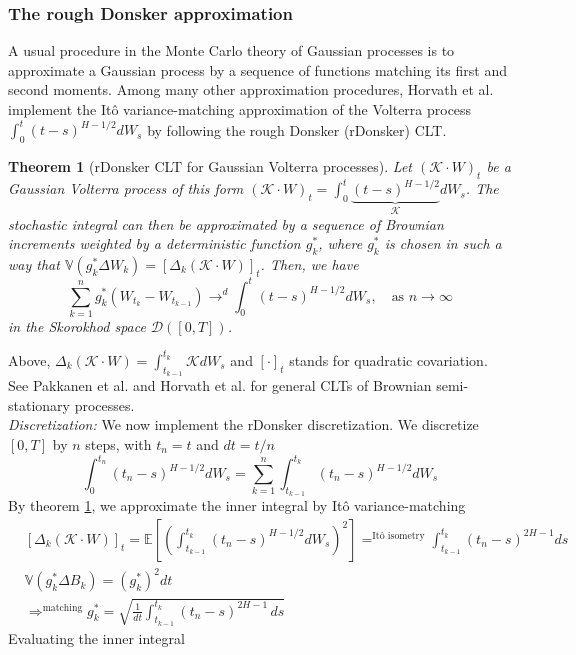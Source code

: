 \documentclass[12pt,a4paper]{article}
\newtheorem{theorem}{Theorem}[section] \newtheorem{proposition}[theorem]{Proposition} \newtheorem{lemma}[theorem]{Lemma} \newtheorem{corollary}[theorem]{Corollary} \theoremstyle{definition} \newtheorem{definition}[theorem]{Definition}
\theoremstyle{remark} \newtheorem{remark}[theorem]{Remark}
\begin{document}
\subsubsection{The rough Donsker approximation}
A usual procedure in the Monte Carlo theory of Gaussian processes is to approximate a Gaussian process by a sequence of functions matching its first and second moments. Among many other approximation procedures, Horvath et al. \cite{2} implement the Itô variance-matching approximation of the Volterra process $\displaystyle 
\int_0^t (t-s)^{H-1/2}dW_s$
by following the rough Donsker (rDonsker) CLT. 
\begin{theorem}[rDonsker CLT for Gaussian Volterra processes]\label{rDonsker thm}
    Let  $(\mathcal K\cdot W)_t$ be a Gaussian Volterra process of this form $(\mathcal K\cdot W)_t=\displaystyle \int _0^t\underbrace{(t-s)^{H-1/2}}_{\mathcal K}dW_s$. The stochastic integral can then be approximated by a sequence of Brownian increments weighted by a deterministic function $g_k^*$, where $g_k^*$ is chosen in such a way that $\displaystyle \mathbb V(g_k^*\Delta W_k)=[\Delta _k(\mathcal K\cdot W)]_t$. Then, we have 
    \[
    \sum _{k=1}^{n}g_k^*\left(W_{t_k}-W_{t_{k-1}}\right)\to^{d} \int _0^t(t-s)^{H-1/2}dW_s, \quad \text{as }n\to \infty 
    \]
    in the Skorokhod space $\mathcal D([0,T])$.
\end{theorem}
Above, $\displaystyle \Delta _k(\mathcal K\cdot W)=\int_{t_{k-1}}^{t_k}\mathcal KdW_s$ and $[\cdot ]_t$ stands for quadratic covariation. See Pakkanen et al. \cite{Pakkanen} and Horvath et al. \cite{2} for general CLTs of Brownian semi-stationary processes.\vspace{1em}\\
\textit{Discretization:} We now implement the rDonsker discretization. We discretize $[0,T]$ by $n$ steps, with $t_n=t$ and $dt=t/n$
\[
\int_{0}^{t_n}(t_n-s)^{H-1/2}dW_s=\sum _{k=1}^n\int_{t_{k-1}}^{t_k}(t_n-s)^{H-1/2}dW_s
\]
By theorem \ref{rDonsker thm}, we approximate the inner integral by Itô variance-matching
\begin{align*}
    &\left[\Delta _k(\mathcal K\cdot W)\right]_t=\mathbb E\left[\left(\int_{t_{k-1}}^{t_k}(t_n-s)^{H-1/2}dW_s\right)^2\right]=^{\text{Itô isometry}}\int_{t_{k-1}}^{t_k}(t_n-s)^{2H-1}ds\\
    & \mathbb V(g_k^* \Delta B_k)=(g_k^*)^2dt\\
    &\Rightarrow^{\text{matching}} g_k^*=\sqrt{\frac{1}{dt}\int_{t_{k-1}}^{t_k}(t_n-s)^{2H-1}\,ds}
\end{align*}
Evaluating the inner integral
\end{document}
